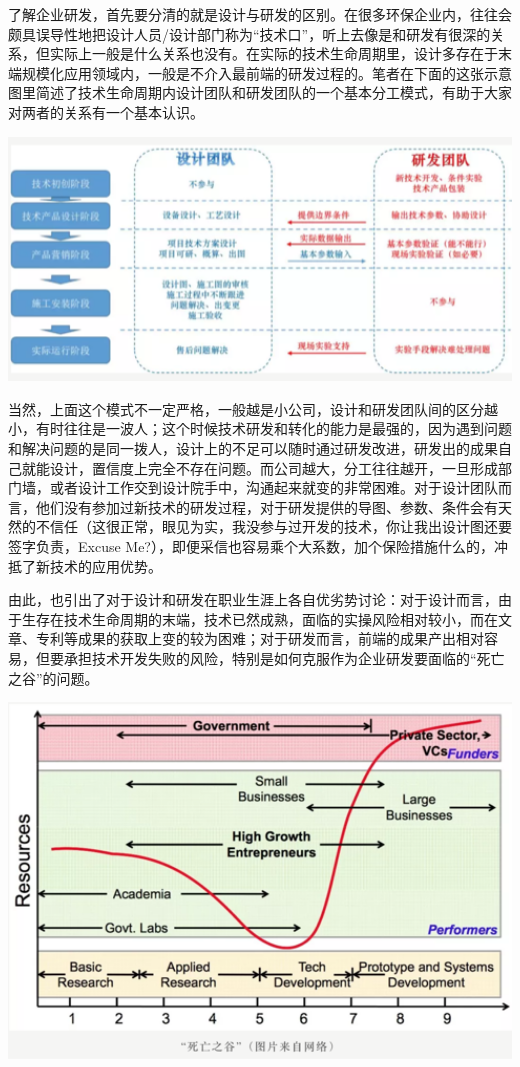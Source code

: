 \documentclass[]{book}
\begin{document}
了解企业研发，首先要分清的就是设计与研发的区别。在很多环保企业内，往往会颇具误导性地把设计人员/设计部门称为``技术口''，听上去像是和研发有很深的关系，但实际上一般是什么关系也没有。在实际的技术生命周期里，设计多存在于末端规模化应用领域内，一般是不介入最前端的研发过程的。笔者在下面的这张示意图里简述了技术生命周期内设计团队和研发团队的一个基本分工模式，有助于大家对两者的关系有一个基本认识。

\includegraphics[width=6.67in]{images/qiye2}

当然，上面这个模式不一定严格，一般越是小公司，设计和研发团队间的区分越小，有时往往是一波人；这个时候技术研发和转化的能力是最强的，因为遇到问题和解决问题的是同一拨人，设计上的不足可以随时通过研发改进，研发出的成果自己就能设计，置信度上完全不存在问题。而公司越大，分工往往越开，一旦形成部门墙，或者设计工作交到设计院手中，沟通起来就变的非常困难。对于设计团队而言，他们没有参加过新技术的研发过程，对于研发提供的导图、参数、条件会有天然的不信任（这很正常，眼见为实，我没参与过开发的技术，你让我出设计图还要签字负责，Excuse
Me?），即便采信也容易乘个大系数，加个保险措施什么的，冲抵了新技术的应用优势。

由此，也引出了对于设计和研发在职业生涯上各自优劣势讨论：对于设计而言，由于生存在技术生命周期的末端，技术已然成熟，面临的实操风险相对较小，而在文章、专利等成果的获取上变的较为困难；对于研发而言，前端的成果产出相对容易，但要承担技术开发失败的风险，特别是如何克服作为企业研发要面临的``死亡之谷''的问题。

\includegraphics[width=6.67in]{images/qiye3}
\end{document}
